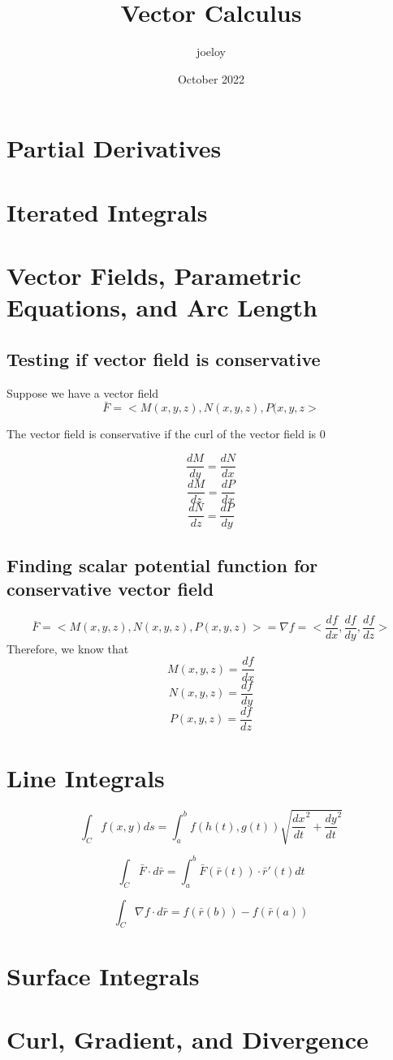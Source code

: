 \documentclass{article}
\title{Vector Calculus}
\author{joeloy }
\date{October 2022}
\begin{document}
\maketitle

\section{Partial Derivatives}

\section{Iterated Integrals}

\section{Vector Fields, Parametric Equations, and Arc Length}

\subsection{Testing if vector field is conservative}
Suppose we have a vector field
$$ \bar{F} = <M(x,y,z), N(x,y,z), P(x,y,z> $$

The vector field is conservative if the curl of the vector field is 0

$$\frac{dM}{dy} = \frac{dN}{dx} $$
$$\frac{dM}{dz} = \frac{dP}{dx} $$
$$\frac{dN}{dz} = \frac{dP}{dy} $$

\subsection{Finding scalar potential function for conservative vector field}
$$ \bar{F} = <M(x,y,z), N(x,y,z), P(x,y,z)> = \nabla f = <\frac{df}{dx}, \frac{df}{dy}, \frac{df}{dz}> $$
 Therefore, we know that 
 $$ M(x,y,z) = \frac{df}{dx} $$
 $$ N(x,y,z) = \frac{df}{dy} $$
 $$ P(x,y,z) = \frac{df}{dz} $$

\section{Line Integrals}

$$ \int_Cf(x,y)ds = \int_a^b f(h(t),g(t))\sqrt{\frac{dx}{dt}^2 + \frac{dy}{dt}^2} $$

$$ \int_C \bar{F} \cdot d\bar{r} = \int_a^b \bar{F}(\bar{r}(t)) \cdot \bar{r}'(t)dt $$

$$ \int_C \nabla f \cdot d\bar{r} = f(\bar{r}(b)) - f(\bar{r}(a))$$

\section{Surface Integrals}

\section{Curl, Gradient, and Divergence}
\end{document}
